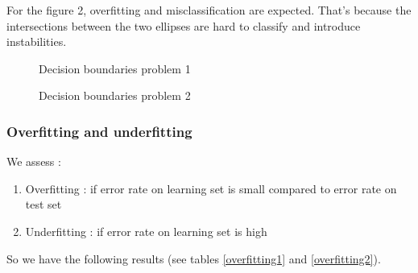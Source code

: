 \documentclass{article}
\begin{document}
For the figure 2, overfitting and misclassification are expected. That's because the intersections between the two
ellipses are hard to classify and introduce instabilities.




\begin{figure}[htbp]
  \centering





  \caption{\label{boundary1}Decision boundaries problem 1}
\end{figure}

\begin{figure}[htbp]
  \centering



  \caption{\label{boundary2}Decision boundaries problem 2}
\end{figure}
\FloatBarrier


\subsubsection{Overfitting and underfitting}

We assess :
\begin{enumerate}
\item Overfitting : if error rate on learning set is small compared to error rate on test set
\item Underfitting : if error rate on learning set is high
\end{enumerate}

So we have the following results (see tables \ref{overfitting1} and \ref{overfitting2}).
\end{document}
